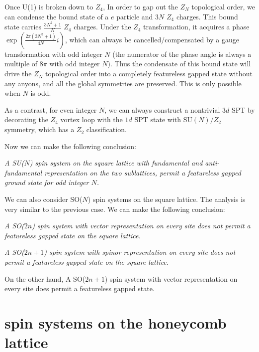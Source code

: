 \documentclass[aps,prb,twocolumn,superscriptaddress,showpacs]{revtex4}
\begin{document}
Once U(1) is broken down to $Z_4$,
In order to gap out the $Z_N$ topological order, we can condense
the bound state of a $e$ particle and $3N$ $Z_4$ charges. This
bound state carries $\frac{3N^2 + 1}{N}$ $Z_4$ charges. Under the
$Z_4$ transformation, it acquires a phase $\exp\left(
\frac{2\pi(3N^2+1)}{4N} i \right)$, which can always be
cancelled/compensated by a gauge transformation with odd integer
$N$ (the numerator of the phase angle is always a multiple of
$8\pi$ with odd integer $N$). Thus the condensate of this bound
state will drive the $Z_N$ topological order into a completely
featureless gapped state without any anyons, and all the global
symmetries are preserved. This is only possible when $N$ is odd.

As a contrast, for even integer $N$, we can always construct a
nontrivial $3d$ SPT by decorating the $Z_4$ vortex loop with the
$1d$ SPT state with SU$(N)/Z_2$ symmetry, which has a $Z_2$
classification.

Now we can make the following conclusion:

{\it A SU($N$) spin system on the square lattice with fundamental
and anti-fundamental representation on the two sublattices, permit
a featureless gapped ground state for odd integer $N$.}

We can also consider SO($N$) spin systems on the square lattice.
The analysis is very similar to the previous case. We can make the
following conclusion:

{\it A SO($2n$) spin system with vector representation on every
site does not permit a featureless gapped state on the square
lattice. }

{\it A SO($2n+1$) spin system with spinor representation on every
site does not permit a featureless gapped state on the square
lattice. }

On the other hand, A SO($2n+1$) spin system with vector
representation on every site does permit a featureless gapped
state.


\section{spin systems on the honeycomb lattice}
\end{document}
